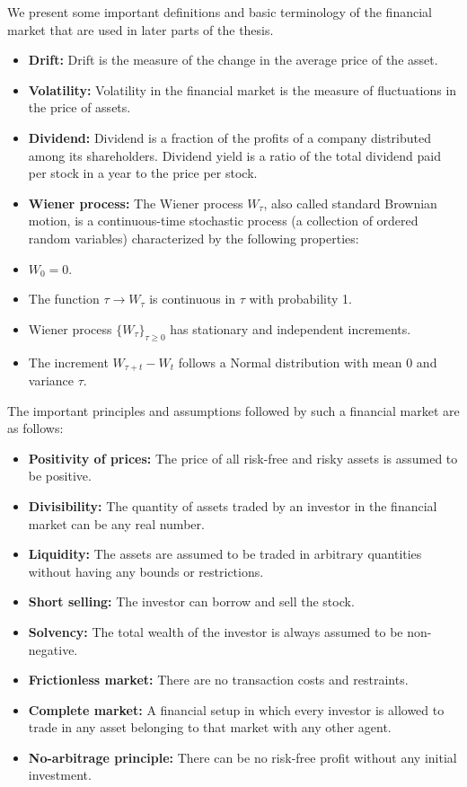 \documentclass[12pt, a4paper]{report}
\begin{document}
We present some important definitions and basic terminology of the financial market that are used in later parts of the thesis.
\begin{itemize}
\item \textbf{Drift:} Drift is the measure of the change in the average price of the asset.

\item \textbf{Volatility:} Volatility in the financial market is the measure of fluctuations in the price of assets.

\item \textbf{Dividend:} Dividend is a fraction of the profits of a company distributed among its shareholders. Dividend yield is a ratio of the total dividend paid per stock in a year to the price per stock.

\item \textbf{Wiener process:} The Wiener process $W_\tau$, also called standard Brownian motion, is a continuous-time stochastic process (a collection of ordered random variables) characterized by the following properties:

    \item $W_0 = 0$.
    \item The function $\tau \rightarrow W_\tau$ is continuous in $\tau$ with probability 1.
    \item Wiener process $\{W_\tau\}_{\tau \geq 0}$ has stationary and independent increments.
    \item The increment $W_{\tau + t} - W_t$ follows a Normal distribution with mean 0 and variance $\tau$.
\end{itemize}

The important principles and assumptions followed by such a financial market are as follows:
\begin{itemize}
    \item \textbf{Positivity of prices:} The price of all risk-free and risky assets is assumed to be positive.
    \item \textbf{Divisibility:} The quantity of assets traded by an investor in the financial market can be any real number.
    \item \textbf{Liquidity:} The assets are assumed to be traded in arbitrary quantities without having any bounds or restrictions.
    \item \textbf{Short selling:} The investor can borrow and sell the stock.
    \item \textbf{Solvency:} The total wealth of the investor is always assumed to be non-negative.
    \item \textbf{Frictionless market:} There are no transaction costs and restraints.
    \item \textbf{Complete market:} A financial setup in which every investor is allowed to trade in any asset belonging to that market with any other agent.
    \item \textbf{No-arbitrage principle:} There can be no risk-free profit without any initial investment.
\end{itemize}
\end{document}
